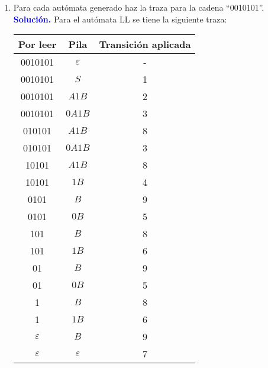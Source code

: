 \documentclass[11pt,fleqn]{article}
\newcommand{\solution}{\textcolor{blue}{\textbf{Solución. }}}
\begin{document}
\begin{enumerate}
\begin{enumerate}
        \item Para cada autómata generado haz la traza para la cadena “0010101”. \\
        \solution Para el autómata LL se tiene la siguiente traza:
        \begin{center}
            \begin{tabular}{c|c|c}
                \hline 
                Por leer & Pila & Transición aplicada \\ 
                \hline 
                0010101 & $\varepsilon$ & - \\ 
                \hline 
                0010101 & $S$ & 1 \\ 
                \hline
                0010101 & $A1B$ & 2 \\ 
                \hline 
                0010101 & $0A1B$ & 3 \\ 
                \hline 
                010101 & $A1B$ & 8 \\ 
                \hline
                010101 & $0A1B$ & 3 \\ 
                \hline
                10101 & $A1B$ & 8 \\ 
                \hline
                10101 & $1B$ & 4 \\ 
                \hline
                0101 & $B$ & 9 \\ 
                \hline
                0101 & $0B$ & 5 \\ 
                \hline
                101 & $B$ & 8 \\ 
                \hline
                101 & $1B$ & 6 \\ 
                \hline
                01 & $B$ & 9 \\ 
                \hline
                01 & $0B$ & 5 \\ 
                \hline
                1 & $B$ & 8 \\ 
                \hline
                1 & $1B$ & 6 \\ 
                \hline
                $\varepsilon$ & $B$ & 9 \\ 
                \hline
                $\varepsilon$ & $\varepsilon$ & 7 \\ 
                \hline
            \end{tabular} 
        \end{center} \newpage
        

\end{enumerate}
\end{enumerate}
\end{document}

